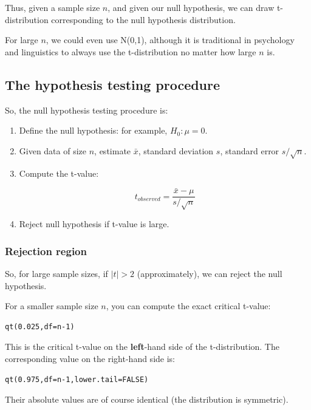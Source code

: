\documentclass[12pt]{article}
\begin{document}
Thus, given a sample size $n$, and given our null hypothesis, we can draw t-distribution corresponding to the null hypothesis distribution.

For large $n$, we could even use N(0,1), although it is traditional in psychology and linguistics to always use the t-distribution no matter how large $n$ is.

\subsection{The hypothesis testing procedure}

So, the null hypothesis testing procedure is:

\begin{enumerate}
\item Define the null hypothesis: for example, $H_0: \mu = 0$.
\item Given data of size $n$, estimate $\bar{x}$, standard deviation $s$, standard error $s/\sqrt{n}$.
\item Compute the t-value:

\begin{equation}
t_{observed}=\frac{\bar{x}-\mu}{s/\sqrt{n}}
\end{equation}
\item Reject null hypothesis if t-value is large.
\end{enumerate}

\subsubsection{Rejection region}

So, for large sample sizes, if $\mid t\mid >2$ (approximately), we can reject the null hypothesis. 

For a smaller sample size $n$, you can compute the exact critical t-value:

\begin{verbatim}
qt(0.025,df=n-1)
\end{verbatim}

This is the critical t-value on the \textbf{left}-hand side of the t-distribution.
The corresponding value on the right-hand side is:

\begin{verbatim}
qt(0.975,df=n-1,lower.tail=FALSE)
\end{verbatim}

Their absolute values are of course identical (the distribution is symmetric).
\end{document}
